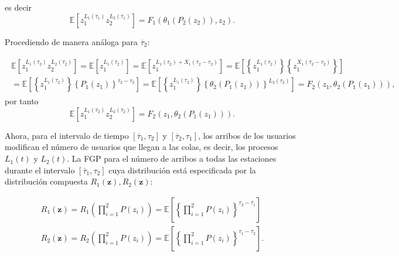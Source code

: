 \documentclass{article}
\newcommand{\esp}{\mathbb{E}}
\numberwithin{equation}{section}
\begin{document}
es decir 
\begin{equation}\label{Eq.base.F1}
\esp\left[z_{1}^{L_{1}\left(\overline{\tau}_{1}\right)}z_{2}^{L_{2}\left(\overline{\tau}_{1}\right)}\right]=F_{1}\left(\theta_{1}\left(P_{2}\left(z_{2}\right)\right),z_{2}\right).
\end{equation}

Procediendo de manera an\'aloga para $\overline{\tau}_{2}$:

\begin{eqnarray*}
\begin{array}{l}
\esp\left[z_{1}^{L_{1}\left(\overline{\tau}_{2}\right)}z_{2}^{L_{2}\left(\overline{\tau}_{2}\right)}\right]=\esp\left[z_{1}^{L_{1}\left(\overline{\tau}_{2}\right)}\right]=\esp\left[z_{1}^{L_{1}\left(\tau_{2}\right)+X_{1}\left(\overline{\tau}_{2}-\tau_{2}\right)}\right]=\esp\left[\left\{z_{1}^{L_{1}\left(\tau_{2}\right)}\right\}\left\{z_{1}^{X_{1}\left(\overline{\tau}_{2}-\tau_{2}\right)}\right\}\right]\\
=\esp\left[\left\{z_{1}^{L_{1}\left(\tau_{2}\right)}\right\}\left\{P_{1}\left(z_{1}\right)\right\}^{\overline{\tau}_{2}-\tau_{2}}\right]=\esp\left[\left\{z_{1}^{L_{1}\left(\tau_{2}\right)}\right\}\left\{\theta_{2}\left(P_{1}\left(z_{1}\right)\right)\right\}^{L_{2}\left(\tau_{2}\right)}\right]=F_{2}\left(z_{1},\theta_{2}\left(P_{1}\left(z_{1}\right)\right)\right),
\end{array}
\end{eqnarray*}
por tanto
\begin{equation}\label{Eq.PGF.Conjunta.Tau2}
\esp\left[z_{1}^{L_{1}\left(\overline{\tau}_{2}\right)}z_{2}^{L_{2}\left(\overline{\tau}_{2}\right)}\right]=F_{2}\left(z_{1},\theta_{2}\left(P_{1}\left(z_{1}\right)\right)\right).
\end{equation}

Ahora, para el intervalo de tiempo
$\left[\overline{\tau}_{1},\tau_{2}\right]$ y $\left[\overline{\tau}_{2},\tau_{1}\right]$, los arribos de los usuarios modifican el n\'umero de usuarios que llegan a las colas, es decir, los procesos
$L_{1}\left(t\right)$ y $L_{2}\left(t\right)$. La FGP para el n\'umero de arribos a todas las estaciones durante el intervalo $\left[\overline{\tau}_{1},\tau_{2}\right]$  cuya distribuci\'on est\'a especificada por la distribuci\'on compuesta $R_{1}\left(\mathbf{z}\right),R_{2}\left(\mathbf{z}\right)$:

\begin{eqnarray*}
R_{1}\left(\mathbf{z}\right)=R_{1}\left(\prod_{i=1}^{2}P\left(z_{i}\right)\right)=\esp\left[\left\{\prod_{i=1}^{2}P\left(z_{i}\right)\right\}^{\tau_{2}-\overline{\tau}_{1}}\right]\\
R_{2}\left(\mathbf{z}\right)=R_{2}\left(\prod_{i=1}^{2}P\left(z_{i}\right)\right)=\esp\left[\left\{\prod_{i=1}^{2}P\left(z_{i}\right)\right\}^{\tau_{1}-\overline{\tau}_{2}}\right].
\end{eqnarray*}
\end{document}
